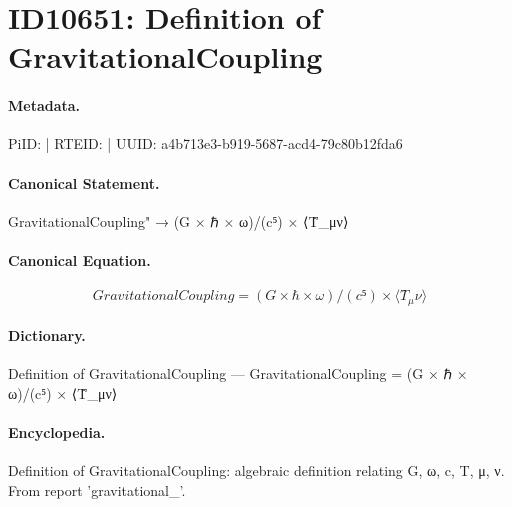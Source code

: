 \section*{ID10651: Definition of GravitationalCoupling}
\paragraph{Metadata.}
PiID:  | RTEID:  | UUID: a4b713e3-b919-5687-acd4-79c80b12fda6

\paragraph{Canonical Statement.}
GravitationalCoupling" → (G × ℏ × ω)/(c⁵) × ⟨T̂\_μν⟩

\paragraph{Canonical Equation.}
\[
GravitationalCoupling = (G × ℏ × ω)/(c⁵) × ⟨T̂_μν⟩
\]

\paragraph{Dictionary.}
Definition of GravitationalCoupling — GravitationalCoupling = (G × ℏ × ω)/(c⁵) × ⟨T̂\_μν⟩

\paragraph{Encyclopedia.}
Definition of GravitationalCoupling: algebraic definition relating G, ω, c, T, μ, ν. From report 'gravitational\_'.
